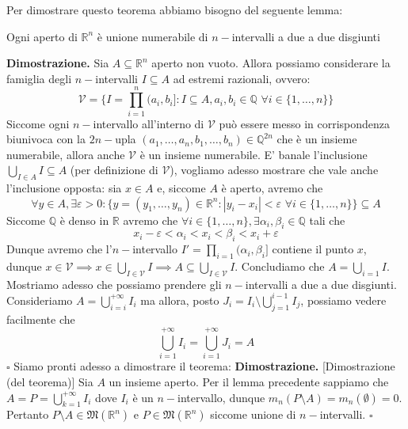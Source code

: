 Per dimostrare questo teorema abbiamo bisogno del seguente lemma:
\begin{lemma}
Ogni aperto di $\mathbb{R}^n$ è unione numerabile di $n-$intervalli a due a due disgiunti
\end{lemma}
%
\noindent \textbf{Dimostrazione. }
	Sia $A \subseteq \mathbb{R}^n$ aperto non vuoto. Allora possiamo considerare la famiglia degli $n-$intervalli $I \subseteq A$ ad estremi razionali, ovvero:
	$$\mathcal{V} = \{I = \prod_{i=1}^n (a_i, b_i] : I \subseteq A, a_i, b_i \in \mathbb{Q} \, \, \forall i \in \{1, \ldots, n\} \}$$
	Siccome ogni $n-$intervallo all'interno di $\mathcal{V}$ può essere messo in corrispondenza biunivoca con la $2n-$upla $(a_1, \ldots, a_n, b_1, \ldots, b_n) \in \mathbb{Q}^{2n}$ che è un insieme numerabile, allora anche $\mathcal{V}$ è un insieme numerabile. E' banale l'inclusione $\bigcup\limits_{I \in A} I \subseteq A$ (per definizione di $\mathcal{V}$), vogliamo
	adesso mostrare che vale anche l'inclusione opposta: sia $x \in A$ e, siccome $A$ è aperto, avremo che 
	$$\forall y \in A, \exists \varepsilon > 0 : \{y = (y_1, \ldots, y_n) \in \mathbb{R}^n : |y_i - x_i| < \varepsilon \, \, \forall i \in \{1, \ldots, n \} \} \subseteq A$$
	Siccome $\mathbb{Q}$ è denso in $\mathbb{R}$ avremo che $\forall i \in \{1, \ldots, n \}, \exists \alpha_i, \beta_i \in \mathbb{Q}$ tali che
	$$
	x_i - \varepsilon < \alpha_i < x_i < \beta_i < x_i + \varepsilon 
	$$
	Dunque avremo che l'$n-$intervallo $I'=\prod\limits_{i=1} (\alpha_i, \beta_i]$ contiene il punto $x$, dunque $x \in \mathcal{V} \implies x \in \bigcup\limits_{I \in \mathcal{V}} I \implies A \subseteq \bigcup\limits_{I \in \mathcal{V}} I$. Concludiamo
	che $A = \bigcup\limits_{i=1} I$. \\
	Mostriamo adesso che possiamo prendere gli $n-$intervalli a due a due disgiunti. Consideriamo $A = \bigcup\limits_{i=i}^{+\infty} I_i$ ma allora, posto $J_i = I_i \setminus \bigcup\limits_{j=1}^{i-1} I_j$, possiamo vedere facilmente che
	$$
	\bigcup_{i=1}^{+\infty} I_i = \bigcup_{i=1}^{+\infty} J_i = A
	$$
\hfill $\square$
%
Siamo pronti adesso a dimostrare il teorema:
%
\noindent \textbf{Dimostrazione. }[Dimostrazione (del teorema)]
	Sia $A$ un insieme aperto. Per il lemma precedente sappiamo che $A = P = \bigcup\limits_{k=1}^{+\infty} I_i$ dove $I_i$ è un $n-$intervallo, dunque $m_n(P \setminus A) = m_n(\emptyset) = 0$.
	Pertanto $P \setminus A \in \mathfrak{M}(\mathbb{R}^n)$ e $P \in \mathfrak{M}(\mathbb{R}^n)$ siccome unione di $n-$intervalli. 
\hfill $\square$
%
\vspace{0.5cm}
